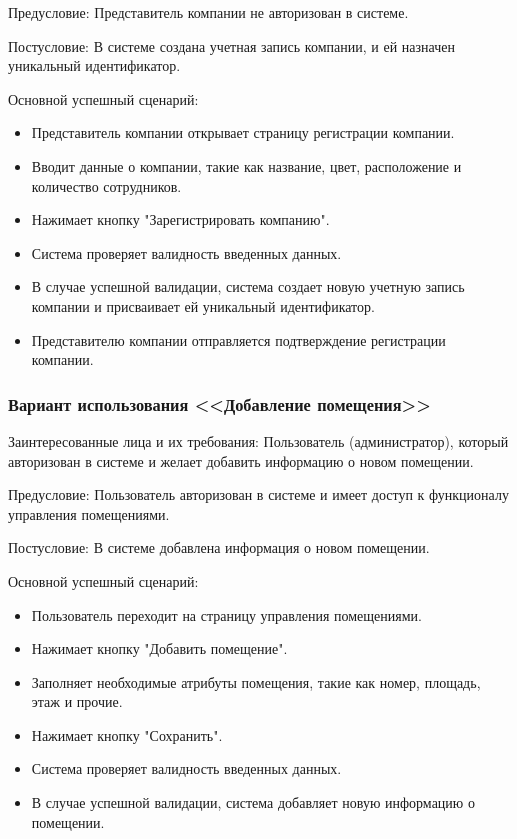 Предусловие: Представитель компании не авторизован в системе.

Постусловие: В системе создана учетная запись компании, и ей назначен уникальный идентификатор.

Основной успешный сценарий:
\begin{itemize}
	\item Представитель компании открывает страницу регистрации компании.
	\item Вводит данные о компании, такие как название, цвет, расположение и количество сотрудников.
	\item Нажимает кнопку "Зарегистрировать компанию".
	\item Система проверяет валидность введенных данных.
	\item В случае успешной валидации, система создает новую учетную запись компании и присваивает ей уникальный идентификатор.
	\item Представителю компании отправляется подтверждение регистрации компании.
\end{itemize}

\subsubsection{Вариант использования <<Добавление помещения>>}

Заинтересованные лица и их требования: Пользователь (администратор), который авторизован в системе и желает добавить информацию о новом помещении.

Предусловие: Пользователь авторизован в системе и имеет доступ к функционалу управления помещениями.

Постусловие: В системе добавлена информация о новом помещении.

Основной успешный сценарий:
\begin{itemize}
	\item Пользователь переходит на страницу управления помещениями.
	\item Нажимает кнопку "Добавить помещение".
	\item Заполняет необходимые атрибуты помещения, такие как номер, площадь, этаж и прочие.
	\item Нажимает кнопку "Сохранить".
	\item Система проверяет валидность введенных данных.
	\item В случае успешной валидации, система добавляет новую информацию о помещении.
\end{itemize}

